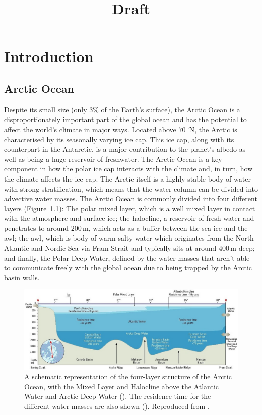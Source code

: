 \documentclass[12pt,a4paper]{report}
\title{Draft}
\newcommand*\figref[1]{Figure~\ref{#1}}
\begin{document}
\maketitle


\chapter{Introduction}
\label{intro}

\glsresetall

\section{Arctic Ocean}
\label{arcticocean}


Despite its small size (only $3\%$ of the Earth's surface), the Arctic
Ocean is a disproportionately important part of the global ocean and has the potential
to affect the world's climate in major ways. Located above
$70\,^{\circ}\mathrm{N}$, the Arctic is characterised by its seasonally
varying ice cap. This ice cap, along with its counterpart in the
Antarctic, is a major contribution to the planet's albedo as well as being
a huge reservoir of freshwater. The Arctic Ocean is a key component
in how the polar ice cap interacts with the climate and, in turn, how
the climate affects the ice cap. 
The Arctic itself is a highly stable body of water with strong stratification, 
which means that the water column can be divided into advective water masses.
The Arctic Ocean is commonly divided into four different layers (\figref{fig:amap}):
The polar mixed layer, which is a well mixed layer in
contact with the atmosphere and surface ice; the halocline, a
reservoir of fresh water and penetrates to around $200\,\mathrm{m}$, which acts
as a buffer between the sea ice and the \gls{awl}; the \gls{awl},
which is body of warm salty water which originates from the North Atlantic and Nordic 
Sea via Fram Strait and typically sits at around $400\,\mathrm{m}$ deep; and finally, 
the Polar Deep Water, defined by the water masses that aren't
able to communicate freely with the global ocean due to being trapped by the Arctic basin walls.



\begin{figure}
	\centering
	\includegraphics[width=\linewidth]{amap}
	\caption[\cite{wilson1998amap}]{  A schematic representation of the four-layer structure of the Arctic Ocean, with the Mixed Layer and Halocline
		above the Atlantic Water and Arctic Deep Water (\cite{aagaard1989role}). 
		The residence time for the different water masses are also shown (\cite{bonisch1995deep}). Reproduced from \cite{wilson1998amap}.}
	\label{fig:amap}
\end{figure}
\end{document}
